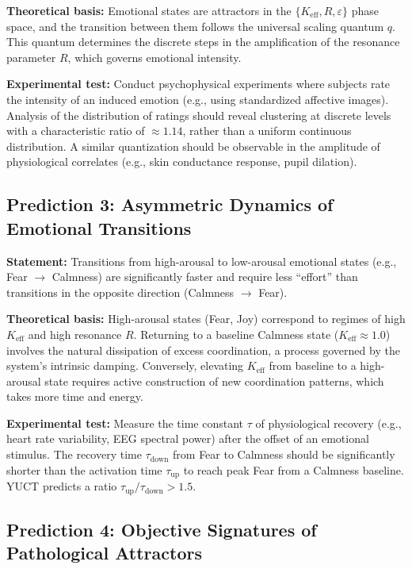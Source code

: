\documentclass[12pt,a4paper]{article}
\begin{document}
	\textbf{Theoretical basis:} Emotional states are attractors in the \(\{K_{\mathrm{eff}}, R, \varepsilon\}\) phase space, and the transition between them follows the universal scaling quantum \(q\). This quantum determines the discrete steps in the amplification of the resonance parameter \(R\), which governs emotional intensity.
	
	\textbf{Experimental test:} Conduct psychophysical experiments where subjects rate the intensity of an induced emotion (e.g., using standardized affective images). Analysis of the distribution of ratings should reveal clustering at discrete levels with a characteristic ratio of \(\approx 1.14\), rather than a uniform continuous distribution. A similar quantization should be observable in the amplitude of physiological correlates (e.g., skin conductance response, pupil dilation).
	
	\subsection{Prediction 3: Asymmetric Dynamics of Emotional Transitions}
	
	\textbf{Statement:} Transitions from high-arousal to low-arousal emotional states (e.g., Fear \(\rightarrow\) Calmness) are significantly faster and require less ``effort'' than transitions in the opposite direction (Calmness \(\rightarrow\) Fear).
	
	\textbf{Theoretical basis:} High-arousal states (Fear, Joy) correspond to regimes of high \(K_{\mathrm{eff}}\) and high resonance \(R\). Returning to a baseline Calmness state (\(K_{\mathrm{eff}} \approx 1.0\)) involves the natural dissipation of excess coordination, a process governed by the system's intrinsic damping. Conversely, elevating \(K_{\mathrm{eff}}\) from baseline to a high-arousal state requires active construction of new coordination patterns, which takes more time and energy.
	
	\textbf{Experimental test:} Measure the time constant \(\tau\) of physiological recovery (e.g., heart rate variability, EEG spectral power) after the offset of an emotional stimulus. The recovery time \(\tau_{\text{down}}\) from Fear to Calmness should be significantly shorter than the activation time \(\tau_{\text{up}}\) to reach peak Fear from a Calmness baseline. YUCT predicts a ratio \(\tau_{\text{up}}/\tau_{\text{down}} > 1.5\).
	
	\subsection{Prediction 4: Objective Signatures of Pathological Attractors}
	
\end{document}
